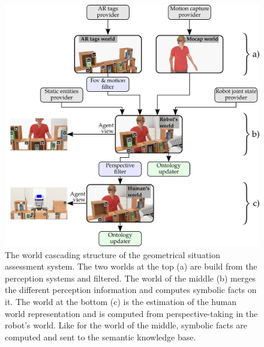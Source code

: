 \begin{figure}[ht!]
\centering
\includegraphics[width=\textwidth]{figures/chapter9/uwds/uwds.png}
\caption{\label{fig:chap9_uwds} The world cascading structure of the geometrical situation assessment system. The two worlds at the top (a) are build from the perception systems and filtered. The world of the middle (b) merges the different perception information and computes symbolic facts on it. The world at the bottom (c) is the estimation of the human world representation and is computed from perspective-taking in the robot's world. Like for the world of the middle, symbolic facts are computed and sent to the semantic knowledge base.}
\end{figure}

